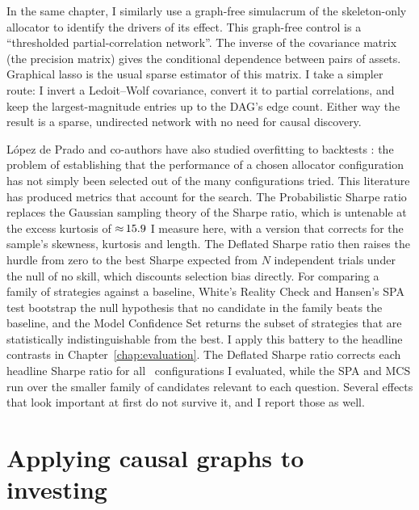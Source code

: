 \documentclass[11pt, a4paper]{report}
\begin{document}
In the same chapter, I similarly use a graph-free simulacrum of the skeleton-only allocator to identify the drivers of its effect. This graph-free control is a ``thresholded partial-correlation network''. 
The inverse of the covariance matrix (the precision matrix) gives the conditional dependence between pairs of assets. Graphical lasso \cite{friedman2008glasso} is the usual sparse estimator of this matrix. I take a simpler route: I invert a Ledoit--Wolf covariance, convert it to partial correlations, and keep the largest-magnitude entries up to the DAG's edge count. Either way the result is a sparse, undirected network with no need for causal discovery.

L\'opez de Prado and co-authors have also studied overfitting to backtests \cite{bailey2014deflated,lopezdeprado2023causal}: the problem of establishing that the performance of a chosen allocator configuration has not simply been selected out of the many configurations tried. This literature has produced metrics that account for the search.
The Probabilistic Sharpe ratio \cite{bailey2012psr} replaces the
Gaussian sampling theory of the Sharpe ratio, which is untenable at the
excess kurtosis of ${\approx}\,15.9$ I measure here, with a
version that corrects for the sample's skewness, kurtosis and length.
The Deflated Sharpe ratio \cite{bailey2014deflated} then raises the
hurdle from zero to the best Sharpe expected from $N$ independent
trials under the null of no skill, which discounts selection
bias directly. For comparing a family of strategies against a baseline, White's
Reality Check \cite{white2000reality} and Hansen's SPA test
\cite{hansen2005spa} bootstrap the null hypothesis that no candidate in
the family beats the baseline, and the Model Confidence Set
\cite{hansen2011mcs} returns the subset of strategies that are
statistically indistinguishable from the best. I apply this battery to
the headline contrasts in Chapter~\ref{chap:evaluation}. The Deflated Sharpe ratio
corrects each headline Sharpe ratio for all \rsNtrials\ configurations I
evaluated, while the SPA and MCS run over the smaller family of
candidates relevant to each question. Several effects that look
important at first do not survive it, and I report those as well.

\section{Applying causal graphs to investing}
\label{sec:causal-investing}
\end{document}
